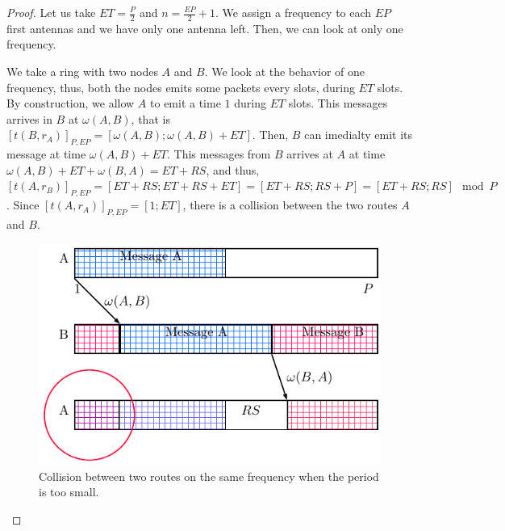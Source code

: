 \documentclass[a4paper,10pt,french,english]{article}
\begin{document}
 \begin{proof}
 Let us take $ET =  \frac{P}{2}$ and $n = \frac{EP}{2} + 1$. We assign a frequency to each $EP$ first antennas and we have only one antenna left. Then, we can look at only one frequency. 
 
 We take a ring with two nodes $A$ and $B$. We look at the behavior of one frequency, thus, both the nodes emits some packets every slots, during $ET$ slots. By construction, we allow $A$ to emit a time $1$ during $ET$ slots. This messages arrives in $B$ at $\omega(A,B)$, that is  $[t(B,r_A)]_{P,EP} = [\omega(A,B);\omega(A,B)+ET]$. Then, $B$ can imedialty emit its message at time $\omega(A,B)+ET$. This messages from $B$ arrives at $A$ at time $\omega(A,B)+ET + \omega(B,A) = ET + RS$, and thus, $[t(A,r_B)]_{P,EP} = [ET + RS;ET + RS + ET] = [ET+RS; RS + P] = [ET + RS; RS] \mod P$. Since $[t(A,r_A)]_{P,EP} = [1;ET]$, there is a collision between the two routes $A$ and $B$.
  \begin{figure}[h]
\centering
      \includegraphics[scale=0.7]{rs.pdf}
     \caption{Collision between two routes on the same frequency when the period is too small.}   \label{fig:proofrs}
  \end{figure}
 \end{proof}
 
\end{document}
